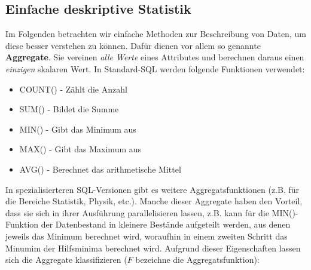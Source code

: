 \subsection{Einfache deskriptive Statistik}
Im Folgenden betrachten wir einfache Methoden zur Beschreibung von Daten, um
diese besser verstehen zu können. Dafür dienen vor allem so genannte
\textbf{Aggregate}. Sie vereinen \textit{alle Werte} eines Attributes und
berechnen daraus einen \textit{einzigen} skalaren Wert. In Standard-SQL werden
folgende Funktionen verwendet: 
\begin{itemize}
	\item COUNT() - Zählt die Anzahl
	\item SUM() - Bildet die Summe
	\item MIN() - Gibt das Minimum aus
	\item MAX() - Gibt das Maximum aus
	\item AVG() - Berechnet das arithmetische Mittel
\end{itemize}
In spezialisierteren SQL-Versionen gibt es weitere Aggregatsfunktionen (z.B.
für die Bereiche Statistik, Physik, etc.). Manche dieser Aggregate haben den
Vorteil, dass sie sich in ihrer Ausführung parallelisieren lassen, z.B. kann
für die MIN()-Funktion der Datenbestand in kleinere Bestände aufgeteilt werden,
aus denen jeweils das Minimum berechnet wird, woraufhin in einem zweiten
Schritt das Minumim der Hilfsminima berechnet wird.
Aufgrund dieser Eigenschaften lassen sich die Aggregate klassifizieren (\(F\)
bezeichne die Aggregatsfunktion):
